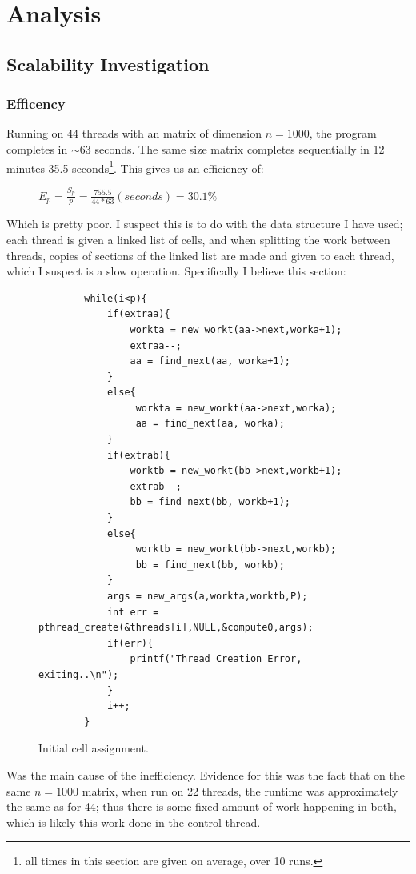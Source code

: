 \documentclass{article}
\begin{document}
{\section{Analysis}
\subsection{Scalability Investigation}
\subsubsection{Efficency}
Running on 44 threads with an matrix of dimension $n=1000$, the program completes in $\sim 63$ seconds. The same size matrix completes sequentially in 12 minutes 35.5 seconds\footnote{all times in this section are given on average, over 10 runs.}. This gives us an efficiency of:
\begin{figure}[H]
    \centering
    $E_p = \frac{S_p}{p} = \frac{755.5}{44*63}(seconds) = 30.1\%$
\end{figure}
Which is pretty poor. I suspect this is to do with the data structure I have used; each thread is given a linked list of cells, and when splitting the work between threads, copies of sections of the linked list are made and given to each thread, which I suspect is a slow operation.
Specifically I believe this section: 
\begin{figure}[H]
    \begin{verbatim}
        while(i<p){
            if(extraa){
                workta = new_workt(aa->next,worka+1);
                extraa--;
                aa = find_next(aa, worka+1);
            }
            else{
                 workta = new_workt(aa->next,worka);
                 aa = find_next(aa, worka);
            }
            if(extrab){
                worktb = new_workt(bb->next,workb+1);
                extrab--;
                bb = find_next(bb, workb+1);
            }
            else{
                 worktb = new_workt(bb->next,workb);
                 bb = find_next(bb, workb);
            }
            args = new_args(a,workta,worktb,P);
            int err = pthread_create(&threads[i],NULL,&compute0,args);
            if(err){
                printf("Thread Creation Error, exiting..\n");
            }
            i++;
        }
        \end{verbatim}
        \caption{Initial cell assignment.}
        \label{slowshit}
\end{figure}
Was the main cause of the inefficiency. Evidence for this was the fact that on the same $n=1000$ matrix, when run on 22 threads, the runtime was approximately the same as for 44; thus there is some fixed amount of work happening in both, which is likely this work done in the control thread.
}
\end{document}
